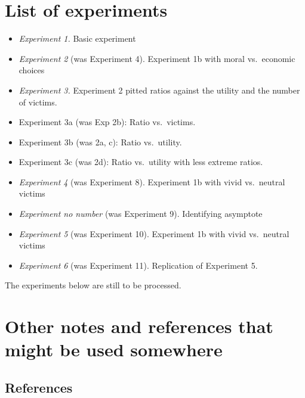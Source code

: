 \documentclass[
]{article}
\providecommand{\tightlist}{%
  \setlength{\itemsep}{0pt}\setlength{\parskip}{0pt}}
\begin{document}
\section{List of experiments}\label{list-of-experiments}

\begin{itemize}
\tightlist
\item
  \emph{Experiment 1.} Basic experiment
\item
  \emph{Experiment 2} (was Experiment 4). Experiment 1b with moral vs.~economic choices
\item
  \emph{Experiment 3.} Experiment 2 pitted ratios against the utility and the number of victims.
\item
  Experiment 3a (was Exp 2b): Ratio vs.~victims.
\item
  Experiment 3b (was 2a, c): Ratio vs.~utility.
\item
  Experiment 3c (was 2d): Ratio vs.~utility with less extreme ratios.
\item
  \emph{Experiment 4} (was Experiment 8). Experiment 1b with vivid vs.~neutral victims
\item
  \emph{Experiment no number} (was Experiment 9). Identifying asymptote
\item
  \emph{Experiment 5} (was Experiment 10). Experiment 1b with vivid vs.~neutral victims
\item
  \emph{Experiment 6} (was Experiment 11). Replication of Experiment 5.
\end{itemize}

The experiments below are still to be processed.

\section{Other notes and references that might be used somewhere}\label{other-notes-and-references-that-might-be-used-somewhere}

\subsection{References}\label{references}
\end{document}
